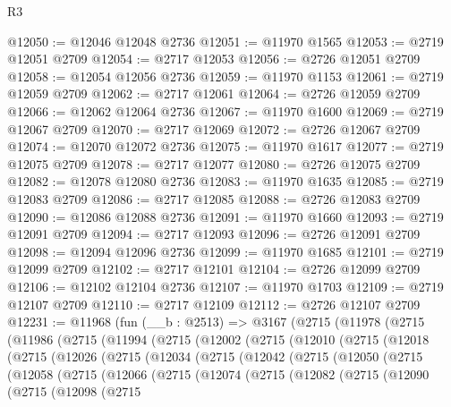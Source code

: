 \begin{lexlean}{R3}
\begin{coremodule}
@12050 := @12046 @12048 @2736
@12051 := @11970 @1565
@12053 := @2719 @12051 @2709
@12054 := @2717 @12053
@12056 := @2726 @12051 @2709
@12058 := @12054 @12056 @2736
@12059 := @11970 @1153
@12061 := @2719 @12059 @2709
@12062 := @2717 @12061
@12064 := @2726 @12059 @2709
@12066 := @12062 @12064 @2736
@12067 := @11970 @1600
@12069 := @2719 @12067 @2709
@12070 := @2717 @12069
@12072 := @2726 @12067 @2709
@12074 := @12070 @12072 @2736
@12075 := @11970 @1617
@12077 := @2719 @12075 @2709
@12078 := @2717 @12077
@12080 := @2726 @12075 @2709
@12082 := @12078 @12080 @2736
@12083 := @11970 @1635
@12085 := @2719 @12083 @2709
@12086 := @2717 @12085
@12088 := @2726 @12083 @2709
@12090 := @12086 @12088 @2736
@12091 := @11970 @1660
@12093 := @2719 @12091 @2709
@12094 := @2717 @12093
@12096 := @2726 @12091 @2709
@12098 := @12094 @12096 @2736
@12099 := @11970 @1685
@12101 := @2719 @12099 @2709
@12102 := @2717 @12101
@12104 := @2726 @12099 @2709
@12106 := @12102 @12104 @2736
@12107 := @11970 @1703
@12109 := @2719 @12107 @2709
@12110 := @2717 @12109
@12112 := @2726 @12107 @2709
@12231 := @11968
    (fun (__b : @2513) =>
    @3167
      (@2715
        (@11978
          (@2715
            (@11986
              (@2715
                (@11994
                  (@2715
                    (@12002
                      (@2715
                        (@12010
                          (@2715
                            (@12018
                              (@2715
                                (@12026
                                  (@2715
                                    (@12034
                                      (@2715
                                        (@12042
                                          (@2715
                                            (@12050
                                              (@2715
                                                (@12058
                                                  (@2715
                                                    (@12066
                                                      (@2715
                                                        (@12074
                                                          (@2715
                                                            (@12082
                                                              (@2715
                                                                (@12090
                                                                  (@2715
                                                                    (@12098
                                                                      (@2715

\end{coremodule}
\end{lexlean}
